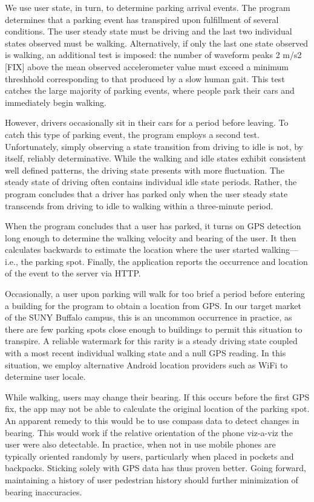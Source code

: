 We use user state, in turn, to determine parking arrival events. The program
determines that a parking event has transpired upon fulfillment of several
conditions.  The user steady state must be driving and the last two
individual states observed must be walking.  Alternatively, if only the last
one state observed is walking, an additional test is imposed:  the number of
waveform peaks 2 m/s2 [FIX] above the mean observed accelerometer value must
exceed a minimum threshhold corresponding to that produced by a slow human
gait.  This test catches the large majority of parking events, where people
park their cars and immediately begin walking.

However, drivers occasionally sit in their cars for a period before leaving.
To catch this type of parking event, the program employs a second test.
Unfortunately, simply observing a state transition from driving to idle is
not, by itself, reliably determinative.  While the walking and idle states
exhibit consistent well defined patterns, the driving state presents with
more fluctuation.  The steady state of driving often contains individual
idle state periods.  Rather, the program concludes that a driver has parked
only when the user steady state transcends from driving to idle to walking
within a three-minute period.

When the program concludes that a user has parked, it turns on GPS detection
long enough to determine the walking velocity and bearing of the user.  It
then calculates backwards to estimate the location where the user started
walking---i.e., the parking spot.  Finally, the application reports the
occurrence and location of the event to the server via HTTP.

Occasionally, a user upon parking will walk for too brief a period before
entering a building for the program to obtain a location from GPS.  In our
target market of the SUNY Buffalo campus, this is an uncommon occurrence in
practice, as there are few parking spots close enough to buildings to permit
this situation to transpire.  A reliable watermark for this rarity is a
steady driving state coupled with a most recent individual walking state and
a null GPS reading.  In this situation, we employ alternative Android
location providers such as WiFi to determine user locale.

While walking, users may change their bearing.  If this occurs before the
first GPS fix, the app may not be able to calculate the original location
of the parking spot.  An apparent remedy to this would be to use compass
data to detect changes in bearing.  This would work if the relative
orientation of the phone viz-a-viz the user were also detectable.  In
practice, when not in use mobile phones are typically oriented randomly by
users, particularly when placed in pockets and backpacks.  Sticking solely
with GPS data has thus proven better.  Going forward, maintaining a history
of user pedestrian history should further minimization of bearing
inaccuracies.

